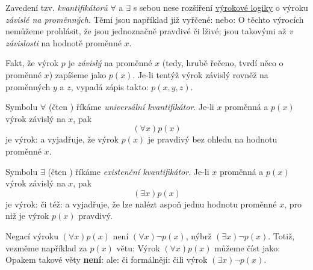 Zavedení tzv. \emph{kvantifikátorů} $ \forall $ a $ \exists $ s sebou nese
rozšíření \hyperref[def:vyrokova-logika]{výrokové logiky} o výroku \emph{závislé
na proměnných}. Těmi jsou například již vyřčené:  nebo:
 O těchto výrocích nemůžeme prohlásit, že jsou jednoznačně
pravdivé či lživé; jsou takovými až \emph{v závislosti} na hodnotě proměnné $x$.

\begin{notation}
  Fakt, že výrok $p$ je \emph{závislý} na proměnné $x$ (tedy, hrubě řečeno,
  tvrdí něco o proměnné $x$) zapíšeme jako $p(x)$. Je-li tentýž výrok závislý
  rovněž na proměnných $y$ a $z$, vypadá zápis takto: $p(x, y, z)$.
\end{notation}

\begin{definition}
  \label{def:universalni-kvantifikator}
  Symbolu $ \forall $ (čten ) říkáme \emph{universální
  kvantifikátor}. Je-li $x$ proměnná a $p(x)$ výrok závislý na $x$, pak
  \begin{equation}
    \label{eq:universalni-kvantifikator}
    ( \forall x) p(x)
  \end{equation}
  je výrok:  a vyjadřuje, že výrok $p(x)$ je
  pravdivý bez ohledu na hodnotu proměnné $x$.
\end{definition}
\lessboxspace
\begin{definition}
  \label{def:existencni-kvantifikator}
  Symbolu $ \exists $ (čten ) říkáme \emph{existenční
  kvantifikátor}. Je-li $x$ proměnná a $p(x)$ výrok závislý na $x$, pak
  \begin{equation}
    \label{eq:existencni-kvantifikator}
    ( \exists x) p(x)
  \end{equation}
  je výrok:  či též:  a vyjadřuje, že lze nalézt aspoň jednu hodnotu proměnné $x$,
  pro niž je výrok $p(x)$ pravdivý.
\end{definition}
\lessboxspace
\begin{remark}
  Negací výroku $( \forall x) p(x)$ není $( \forall x) \neg p(x)$, nýbrž $(
  \exists x) \neg p(x)$. Totiž, vezměme například za $p(x)$ větu:  Výrok $( \forall x) p(x)$ můžeme číst jako:  Opakem takové věty \textbf{není}:  ale:
   či formálněji:  čili výrok $( \exists x) \neg p(x)$.
\end{remark}
